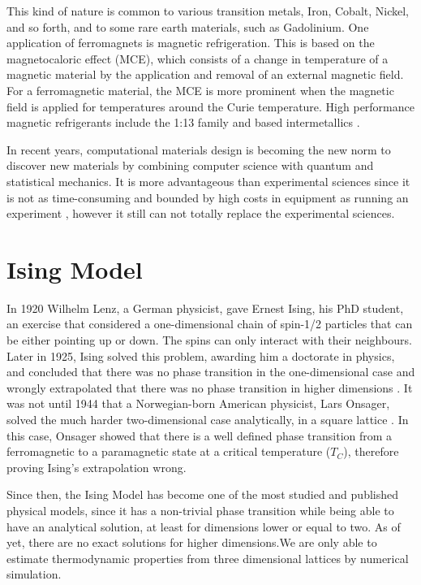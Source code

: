 This kind of nature is common to various transition metals, Iron, Cobalt, Nickel, and so forth, and to some rare earth materials, such as Gadolinium.
One application of ferromagnets is magnetic refrigeration. This is based on the magnetocaloric effect (MCE), which consists of a change in temperature of a magnetic material by the application and removal of an external magnetic field. For a ferromagnetic material, the MCE is more prominent when the magnetic field is applied for temperatures around the Curie temperature. 
High performance magnetic refrigerants include the  1:13 family \cite{Fujita} and  based intermetallics \cite{Bruck}. 

In recent years, computational materials design is becoming the new norm to discover new materials by combining computer science with quantum and statistical mechanics. It is more advantageous than experimental sciences since it is not as time-consuming and bounded by high costs in equipment as running an experiment \cite{Curtarolo2013,Chen2019, Sanvito2017}, however it still can not totally replace the experimental sciences.

\section{Ising Model}

In 1920 Wilhelm Lenz, a German physicist, gave Ernest Ising, his PhD student, an exercise that considered a one-dimensional chain of spin-1/2 particles that can be either pointing up or down. The spins can only interact with their neighbours. Later in 1925, Ising solved this problem, awarding him a doctorate in physics,  and concluded that there was no phase transition in the one-dimensional case and wrongly extrapolated that there was no phase transition in higher dimensions \cite{Ising1925}. It was not until 1944 that a Norwegian-born American physicist, Lars Onsager, solved the much harder two-dimensional case analytically, in a square lattice \cite{Onsager1944}. In this case, Onsager showed that there is a well defined phase transition from a ferromagnetic to a paramagnetic state at a critical temperature ($T_C$), therefore proving Ising's extrapolation wrong.

Since then, the Ising Model has become one of the most studied and published physical models, since it has a non-trivial phase transition while being able to have an analytical solution, at least for dimensions lower or equal to two. As of yet, there are no exact solutions for higher dimensions.We are only able to estimate thermodynamic properties from three dimensional lattices by numerical simulation.

